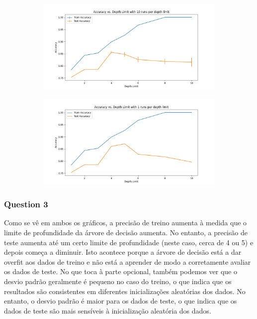 \documentclass{article}
\begin{document}
\begin{figure}[H]
  \centering
  \begin{subfigure}{0.55\textwidth}
    \includegraphics[width=\linewidth]{images/accuracy_vs_depth_limit.png}
  \end{subfigure}
  \begin{subfigure}{0.55\textwidth}
    \includegraphics[width=\linewidth]{images/accuracy_vs_depth_limit_without_optional.png}
  \end{subfigure}
\end{figure}

\subsubsection*{Question 3}
Como se vê em ambos os gráficos, a precisão de treino aumenta à medida que o limite de profundidade da árvore de decisão aumenta. No entanto, a precisão de teste aumenta até um certo limite de profundidade (neste caso, cerca de 4 ou 5) e depois começa a diminuir. Isto acontece porque a árvore de decisão está a dar overfit aos dados de treino e não está a aprender de modo a corretamente avaliar os dados de teste.
No que toca à parte opcional, também podemos ver que o desvio padrão geralmente é pequeno no caso do treino, o que indica que os resultados são consistentes em diferentes inicializações aleatórias dos dados. No entanto, o desvio padrão é maior para os dados de teste, o que indica que os dados de teste são mais sensíveis à inicialização aleatória dos dados.
\end{document}
